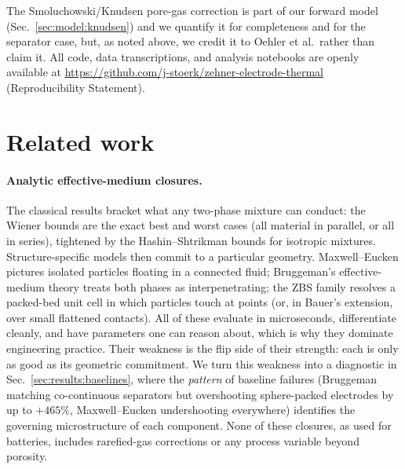 \documentclass[10pt,a4paper]{article}
\begin{document}
The Smoluchowski/Knudsen pore-gas correction is part of our forward model (Sec.~\ref{sec:model:knudsen}) and we quantify it for completeness and for the separator case, but, as noted above, we credit it to Oehler et al.\ rather than claim it. All code, data transcriptions, and analysis notebooks are openly available at \url{https://github.com/j-stoerk/zehner-electrode-thermal} (Reproducibility Statement).

\section{Related work}
\label{sec:related}

\paragraph{Analytic effective-medium closures.}
The classical results bracket what any two-phase mixture can conduct: the Wiener bounds \cite{wiener1912} are the exact best and worst cases (all material in parallel, or all in series), tightened by the Hashin--Shtrikman bounds \cite{hashin1962} for isotropic mixtures. Structure-specific models then commit to a particular geometry. Maxwell--Eucken \cite{maxwell1891,eucken1932} pictures isolated particles floating in a connected fluid; Bruggeman's effective-medium theory \cite{bruggeman1935} treats both phases as interpenetrating; the ZBS family \cite{zehner1970,bauer1978,vdi} resolves a packed-bed unit cell in which particles touch at points (or, in Bauer's extension, over small flattened contacts). All of these evaluate in microseconds, differentiate cleanly, and have parameters one can reason about, which is why they dominate engineering practice. Their weakness is the flip side of their strength: each is only as good as its geometric commitment. We turn this weakness into a diagnostic in Sec.~\ref{sec:results:baselines}, where the \emph{pattern} of baseline failures (Bruggeman matching co-continuous separators but overshooting sphere-packed electrodes by up to $+465\%$, Maxwell--Eucken undershooting everywhere) identifies the governing microstructure of each component. None of these closures, as used for batteries, includes rarefied-gas corrections or any process variable beyond porosity.
\end{document}

